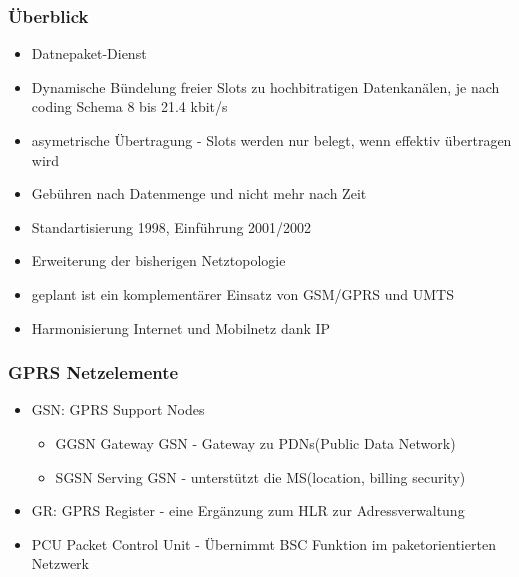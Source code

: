 \subsubsection{Überblick}
\begin{itemize}
\item Datnepaket-Dienst
\item Dynamische Bündelung freier Slots zu hochbitratigen Datenkanälen, je nach coding Schema 8 bis 21.4 kbit/s
\item asymetrische Übertragung - Slots werden nur belegt, wenn effektiv übertragen wird
\item Gebühren nach Datenmenge und nicht mehr nach Zeit
\item Standartisierung 1998, Einführung 2001/2002
\item Erweiterung der bisherigen Netztopologie
\item geplant ist ein komplementärer Einsatz von GSM/GPRS und UMTS
\item Harmonisierung Internet und Mobilnetz dank IP
\end{itemize}
\subsubsection{GPRS Netzelemente}
\begin{itemize}
\item GSN: GPRS Support Nodes
\begin{itemize}
\item GGSN Gateway GSN - Gateway zu PDNs(Public Data Network)
\item SGSN Serving GSN - unterstützt die MS(location, billing security)
\end{itemize}
\item GR: GPRS Register - eine Ergänzung zum HLR zur Adressverwaltung
\item PCU Packet Control Unit - Übernimmt BSC Funktion im paketorientierten Netzwerk
\end{itemize}

